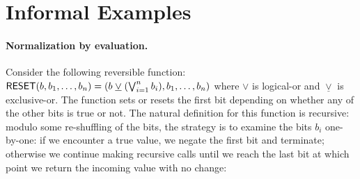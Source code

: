 \section{Informal Examples}





\paragraph*{Normalization by evaluation.} Consider the following reversible function:
$\Afun{RESET}(b,b_1,\ldots,b_n) = (b \; \underline{\vee} \; (\bigvee_{i=1}^n b_i),b_1,\ldots,b_n)$ where $\vee$ is
logical-or and $\underline{\vee}$ is exclusive-or. The function sets or resets the first bit depending on whether any of
the other bits is true or not. The natural definition for this function is recursive: modulo some re-shuffling of the
bits, the strategy is to examine the bits $b_i$ one-by-one: if we encounter a true value, we negate the first bit and
terminate; otherwise we continue making recursive calls until we reach the last bit at which point we return the
incoming value with no change:

